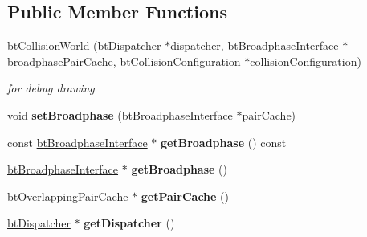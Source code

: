 \subsection*{Public Member Functions}
\begin{DoxyCompactItemize}
\item 
\mbox{\label{classbtCollisionWorld_a6d2c3ec40c17296308c2b229ae3962ea}} 
\hyperlink{classbtCollisionWorld_a6d2c3ec40c17296308c2b229ae3962ea}{bt\+Collision\+World} (\hyperlink{classbtDispatcher}{bt\+Dispatcher} $\ast$dispatcher, \hyperlink{classbtBroadphaseInterface}{bt\+Broadphase\+Interface} $\ast$broadphase\+Pair\+Cache, \hyperlink{classbtCollisionConfiguration}{bt\+Collision\+Configuration} $\ast$collision\+Configuration)
\begin{DoxyCompactList}\small\item\em for debug drawing \end{DoxyCompactList}\item 
\mbox{\label{classbtCollisionWorld_ad55a4c7bd8fb64e4caf6c58e62795bfb}} 
void {\bfseries set\+Broadphase} (\hyperlink{classbtBroadphaseInterface}{bt\+Broadphase\+Interface} $\ast$pair\+Cache)
\item 
\mbox{\label{classbtCollisionWorld_a214257b6cf2ab762454254ab4c79e1d9}} 
const \hyperlink{classbtBroadphaseInterface}{bt\+Broadphase\+Interface} $\ast$ {\bfseries get\+Broadphase} () const
\item 
\mbox{\label{classbtCollisionWorld_a6138b6b1a4496a6857f1dfa71f6841e5}} 
\hyperlink{classbtBroadphaseInterface}{bt\+Broadphase\+Interface} $\ast$ {\bfseries get\+Broadphase} ()
\item 
\mbox{\label{classbtCollisionWorld_a7327cc034ead04b732bd242f21b690cf}} 
\hyperlink{classbtOverlappingPairCache}{bt\+Overlapping\+Pair\+Cache} $\ast$ {\bfseries get\+Pair\+Cache} ()
\item 
\mbox{\label{classbtCollisionWorld_a65b5cb3b0070b3aca14cb4c2aff25ed5}} 
\hyperlink{classbtDispatcher}{bt\+Dispatcher} $\ast$ {\bfseries get\+Dispatcher} ()
\item 
\mbox{\label{classbtCollisionWorld_a1b29bf1f9ba7b192838708a3650ea26e}} 

\end{DoxyCompactItemize}
